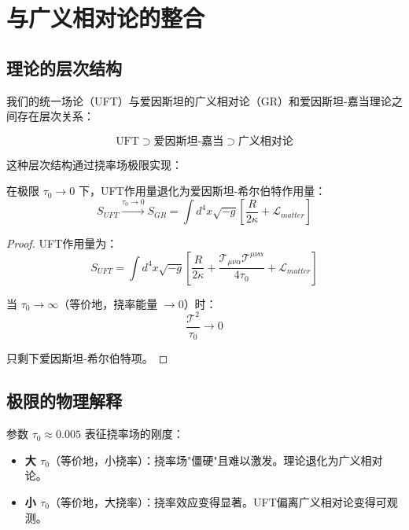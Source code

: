 \section{与广义相对论的整合}
\label{sec:gr_integration}

\subsection{理论的层次结构}

我们的统一场论（UFT）与爱因斯坦的广义相对论（GR）和爱因斯坦-嘉当理论之间存在层次关系：

\begin{equation}
    \text{UFT} \supset \text{爱因斯坦-嘉当} \supset \text{广义相对论}
    \label{eq:theory_hierarchy}
\end{equation}

这种层次结构通过挠率场极限实现：

\begin{theorem}[UFT的广义相对论极限]
在极限 $\tau_0 \to 0$ 下，UFT作用量退化为爱因斯坦-希尔伯特作用量：
\begin{equation}
    S_{UFT} \xrightarrow{\tau_0 \to 0} S_{GR} = \int d^4x \sqrt{-g} \left[\frac{R}{2\kappa} + \mathcal{L}_{matter}\right]
\end{equation}
\end{theorem}

\begin{proof}
UFT作用量为：
\begin{equation}
    S_{UFT} = \int d^4x \sqrt{-g} \left[\frac{R}{2\kappa} + \frac{\mathcal{T}_{\mu\nu\alpha}\mathcal{T}^{\mu\nu\alpha}}{4\tau_0} + \mathcal{L}_{matter}\right]
\end{equation}

当 $\tau_0 \to \infty$（等价地，挠率能量 $\to 0$）时：
\begin{equation}
    \frac{\mathcal{T}^2}{\tau_0} \to 0
\end{equation}

只剩下爱因斯坦-希尔伯特项。
\end{proof}

\subsection{极限的物理解释}

参数 $\tau_0 \approx 0.005$ 表征挠率场的刚度：

\begin{itemize}
    \item \textbf{大 $\tau_0$}（等价地，小挠率）：挠率场"僵硬"且难以激发。理论退化为广义相对论。
    \item \textbf{小 $\tau_0$}（等价地，大挠率）：挠率效应变得显著。UFT偏离广义相对论变得可观测。
\end{itemize}

